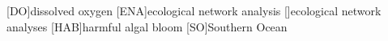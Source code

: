 \begin{acronym}[SEPSEP]
[DO]{dissolved oxygen}
[ENA]{ecological network analysis}
    []{ecological network analyses}
[HAB]{harmful algal bloom}
[SO]{Southern Ocean}
\end{acronym}


